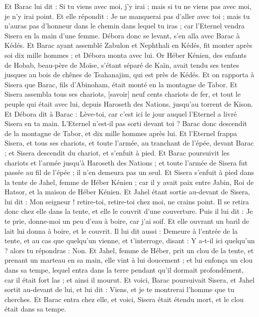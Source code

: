 \begin{multicols}{2}
Et Barac lui dit : Si tu viens avec moi, j'y irai ; mais si tu ne viens pas avec moi, je n'y irai point.
Et elle répondit : Je ne manquerai pas d'aller avec toi ; mais tu n'auras pas d'honneur dans le chemin dans lequel tu iras ; car l'Eternel vendra Sisera en la main d'une femme. Débora donc se levant, s'en alla avec Barac à Kédés.
Et Barac ayant assemblé Zabulon et Nephthali en Kédés, fit monter après soi dix mille hommes ; et Débora monta avec lui.
Or Héber Kénien, des enfants de Hobab, beau-père de Moïse, s'étant séparé de Kaïn, avait tendu ses tentes jusques au bois de chênes de Tsahanajim, qui est près de Kédés.
Et on rapporta à Sisera que Barac, fils d'Abinoham, était monté en la montagne de Tabor.
Et Sisera assembla tous ses chariots, [savoir] neuf cents chariots de fer, et tout le peuple qui était avec lui, depuis Haroseth des Nations, jusqu'au torrent de Kison.
Et Débora dit à Barac : Lève-toi, car c'est ici le jour auquel l'Eternel a livré Sisera en ta main. L'Eternel n'est-il pas sorti devant toi ? Barac donc descendit de la montagne de Tabor, et dix mille hommes après lui.
Et l'Eternel frappa Sisera, et tous ses chariots, et toute l'armée, au tranchant de l'épée, devant Barac ; et Sisera descendit du chariot, et s'enfuit à pied.
Et Barac poursuivit les chariots et l'armée jusqu'à Haroseth des Nations ; et toute l'armée de Sisera fut passée au fil de l'épée ; il n'en demeura pas un seul.
Et Sisera s'enfuit à pied dans la tente de Jahel, femme de Héber Kénien ; car il y avait paix entre Jabin, Roi de Hatsor, et la maison de Héber Kénien.
Et Jahel étant sortie au-devant de Sisera, lui dit : Mon seigneur ! retire-toi, retire-toi chez moi, ne crains point. Il se retira donc chez elle dans la tente, et elle le couvrit d'une couverture.
Puis il lui dit : Je te prie, donne-moi un peu d'eau à boire, car j'ai soif. Et elle ouvrant un baril de lait lui donna à boire, et le couvrit.
Il lui dit aussi : Demeure à l'entrée de la tente, et au cas que quelqu'un vienne, et t'interroge, disant : Y a-t-il ici quelqu'un ? alors tu répondras : Non.
Et Jahel, femme de Héber, prit un clou de la tente, et prenant un marteau en sa main, elle vint à lui doucement ; et lui enfonça un clou dans sa tempe, lequel entra dans la terre pendant qu'il dormait profondément, car il était fort las ; et ainsi il mourut.
Et voici, Barac poursuivait Sisera, et Jahel sortit au-devant de lui, et lui dit : Viens, et je te montrerai l'homme que tu cherches. Et Barac entra chez elle, et voici, Sisera était étendu mort, et le clou était dans sa tempe.

\end{multicols}
